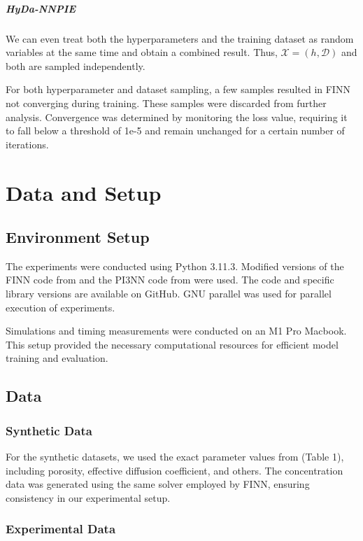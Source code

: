 \paragraph{HyDa-NNPIE}

We can even treat both the hyperparameters and the training dataset as random variables at the same time and obtain a combined result. Thus, $\mathcal{X} = (h, \mathcal{D})$ and both are sampled independently.

For both hyperparameter and dataset sampling, a few samples resulted in FINN not converging during training. These samples were discarded from further analysis. Convergence was determined by monitoring the loss value, requiring it to fall below a threshold of 1e-5 and remain unchanged for a certain number of iterations.


\chapter{Data and Setup}
\label{sec:data_and_setup}
\section{Environment Setup}
The experiments were conducted using Python 3.11.3. Modified versions of the FINN code from \cite{finn} and the PI3NN code from \cite{pi3nn} were used. The code and specific library versions are available on GitHub. GNU parallel \cite{tange_2023_10199085} was used for parallel execution of experiments. %

Simulations and timing measurements were conducted on an M1 Pro Macbook. This setup provided the necessary computational resources for efficient model training and evaluation.


\section{Data}
\subsection{Synthetic Data}
\label{sec:synthetic_data}
For the synthetic datasets, we used the exact parameter values from \cite{finn} (Table 1), including porosity, effective diffusion coefficient, and others. The concentration data was generated using the same solver employed by FINN, ensuring consistency in our experimental setup.


\subsection{Experimental Data}
\label{sec:experimental_data}

